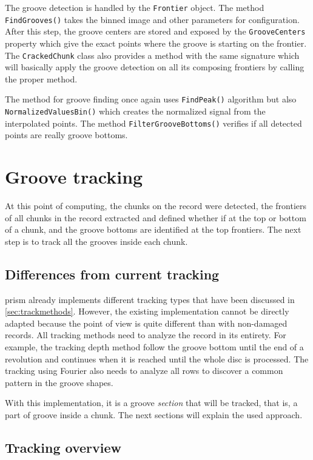 The groove detection is handled by the \texttt{Frontier} object. The method \texttt{FindGrooves()} takes the binned image and other parameters for configuration. After this step, the groove centers are stored and exposed by the \texttt{GrooveCenters} property which give the exact points where the groove is starting on the frontier. The \texttt{CrackedChunk} class also provides a method with the same signature which will basically apply the groove detection on all its composing frontiers by calling the proper method.

The method for groove finding once again uses \texttt{FindPeak()} algorithm but also \texttt{NormalizedValuesBin()} which creates the normalized signal from the interpolated points. The method \texttt{FilterGrooveBottoms()} verifies if all detected points are really groove bottoms.

\section{Groove tracking}
\label{sec:groovetracking}

At this point of computing, the chunks on the record were detected, the frontiers of all chunks in the record extracted and defined whether if at the top or bottom of a chunk, and the groove bottoms are identified at the top frontiers. The next step is to track all the grooves inside each chunk.

\subsection{Differences from current tracking}

\gls{prism} already implements different tracking types that have been discussed in \autoref{sec:trackmethods}. However, the existing implementation cannot be directly adapted because the point of view is quite different than with non-damaged records. All tracking methods need to analyze the record in its entirety. For example, the tracking depth method follow the groove bottom until the end of a revolution and continues when it is reached until the whole disc is processed. The tracking using Fourier also needs to analyze all rows to discover a common pattern in the groove shapes.

With this implementation, it is a groove \emph{section} that will be tracked, that is, a part of groove inside a chunk. The next sections will explain the used approach.

\subsection{Tracking overview}

